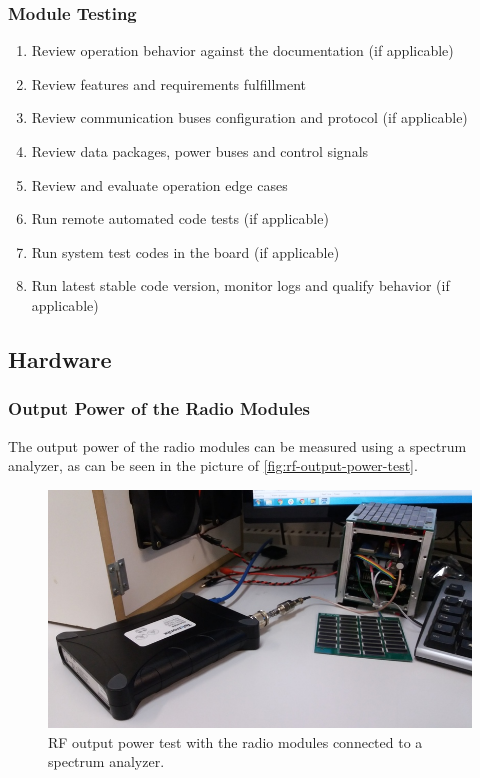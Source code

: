 \subsubsection{Module Testing}
\begin{enumerate} \setlength\itemsep{-0.3em}
    \item Review operation behavior against the documentation (if applicable)
    \item Review features and requirements fulfillment
    \item Review communication buses configuration and protocol (if applicable)
    \item Review data packages, power buses and control signals
    \item Review and evaluate operation edge cases
    \item Run remote automated code tests (if applicable)
    \item Run system test codes in the board (if applicable)
    \item Run latest stable code version, monitor logs and qualify behavior (if applicable)
\end{enumerate}










\subsection{Hardware}

\subsubsection{Output Power of the Radio Modules}

The output power of the radio modules can be measured using a spectrum analyzer, as can be seen in the picture of \autoref{fig:rf-output-power-test}.

\begin{figure}[!ht]
    \begin{center}
        \includegraphics[width=\textwidth]{figures/rf-output-power-test.jpg}
        \caption{RF output power test with the radio modules connected to a spectrum analyzer.}
        \label{fig:rf-output-power-test}
    \end{center}
\end{figure}


